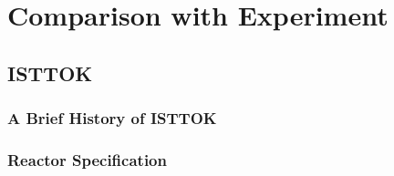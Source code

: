 
\chapter{Comparison with Experiment}
\label{chapter5}

\section{ISTTOK}

\subsection{A Brief History of ISTTOK}

\subsection{Reactor Specification}

\section{}

